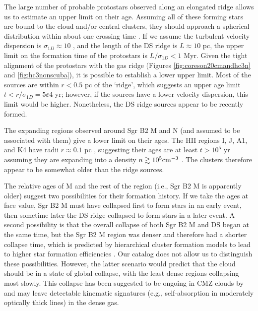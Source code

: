 \documentclass[twocolumn]{aastex61}
\begin{document}
The large number of probable protostars observed along an elongated ridge
allows us to estimate an upper limit on their age.  Assuming all of these
forming stars are bound to the cloud and/or central clusters, they should
approach a spherical distribution within about one crossing time
\citep{Efremov1998a}.  If we assume the turbulent velocity dispersion is
$\sigma_{1D}\approx10$ \kms \citep[e.g.][]{Henshaw2016a}, and the length of the
DS ridge is $L\approx10$ pc, the upper limit on the formation time of the
protostars is $L/\sigma_{1D}<1$ Myr.  Given the tight alignment of the
protostars with the gas ridge (Figures \ref{fig:coreson20cmandhc3n} and
\ref{fig:hc3nonscuba}), it is  possible to establish a lower upper
limit.  Most of the sources are within $r<0.5$ pc of the `ridge', which
suggests an upper age limit $t<r/\sigma_{1D}=5\ee{4}$ yr; however, if
the sources have a lower velocity dispersion, this limit would be higher.
Nonetheless, the DS ridge sources appear to be recently formed.

The expanding \hii regions observed around Sgr B2 M and N (and assumed to be
associated with them) give a lower limit on their ages.  The HII regions I, J,
A1, and K4 have radii $r\approx0.1$ pc \citep{Gaume1995a}, suggesting their
ages are at least $t>10^5$ yr assuming they are expanding into 
a density $n\gtrsim10^5 \textrm{cm}^{-3}$ \citep{de-Pree1995a,Schmiedeke2016a}.
The clusters therefore appear to be somewhat older than the ridge sources.


The relative ages of M and the rest of the region (i.e., Sgr B2 M is apparently
older) suggest two possibilities for their formation history.  If we take the
ages at face value, Sgr B2 M must have collapsed first to form stars in an
early event, then sometime later the DS ridge collapsed to form stars in a
later event.  A second possibility is that the overall collapse of both Sgr B2
M and DS began at the same time, but the Sgr B2 M region was denser and
therefore had a shorter collapse time, which is predicted by hierarchical
cluster formation models to lead to higher star formation efficiencies
\citep{Kruijssen2012a}.  Our catalog does not allow us to distinguish these
possibilities.  However, the latter scenario would predict that the cloud
should be in a state of global collapse, with the least dense regions
collapsing most slowly.  This collapse has been suggested to be ongoing in CMZ
clouds by \citet{Walker2015a,Walker2016a} and may leave detectable kinematic
signatures (e.g., self-absorption in moderately optically thick lines) in the
dense gas.
\end{document}
